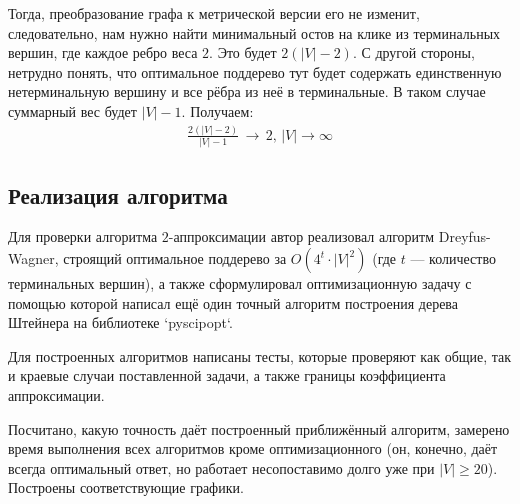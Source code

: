 \documentclass[a4paper,12pt]{article}
\begin{document}
\begin{figure}[h!]
        \vspace{1em}

    \end{figure}

    \noindent Тогда, преобразование графа к метрической версии его не изменит, следовательно, нам нужно найти минимальный остов на клике из терминальных вершин, где каждое ребро веса $2$. Это будет $2 \left(|V| - 2\right)$. С другой стороны, нетрудно понять, что оптимальное поддерево тут будет содержать единственную нетерминальную вершину и все рёбра из неё в терминальные. В таком случае суммарный вес будет $|V| - 1$. Получаем:
    \begin{gather*}
        \frac{2 \left(|V| - 2\right)}{|V| - 1} \, \to \, 2, \, |V| \to \infty
    \end{gather*}
    
    \subsection{Реализация алгоритма}

    Для проверки алгоритма $2$-аппроксимации автор реализовал алгоритм Dreyfus-Wagner, строящий оптимальное поддерево за $O\left(4^t \cdot |V|^2\right)$ (где $t$ — количество терминальных вершин), а также сформулировал оптимизационную задачу с помощью которой написал ещё один точный алгоритм построения дерева Штейнера на библиотеке `pyscipopt`.

    \vspace{1em}

    \noindent Для построенных алгоритмов написаны тесты, которые проверяют как общие, так и краевые случаи поставленной задачи, а также границы коэффициента аппроксимации.

    \vspace{1em}

    \noindent Посчитано, какую точность даёт построенный приближённый алгоритм, замерено время выполнения всех алгоритмов кроме оптимизационного (он, конечно, даёт всегда оптимальный ответ, но работает несопоставимо долго уже при $|V| \geqslant 20$). Построены соответствующие графики.
\end{document}
